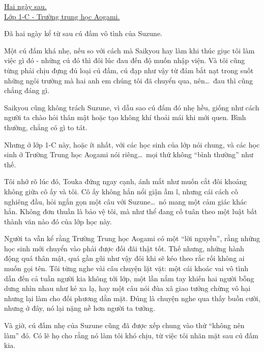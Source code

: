 \documentclass[../main.tex]{subfiles}
\begin{document}

\begin{center}
  \uline{Hai ngày sau.\\Lớp 1-C - Trường trung học Aogami.}
\end{center}

Đã hai ngày kể từ sau cú đấm vô tình của Suzune.

Một cú đấm khá nhẹ, nếu so với cách mà Saikyou hay làm khi thúc giục tôi làm việc gì đó - những cú đó thì đôi lúc đau đến độ muốn nhập viện. Và tôi cũng từng phải chịu đựng đủ loại cú đấm, cú đạp như vậy từ đám bắt nạt trong suốt những ngôi trường mà hai anh em chúng tôi đã chuyển qua, nên\dots\ đau thì cũng chẳng đáng gì.

Saikyou cũng không trách Suzune, vì dẫu sao cú đấm đó nhẹ hều, giống như cách người ta chào hỏi thân mật hoặc tạo không khí thoải mái khi mới quen. Bình thường, chẳng có gì to tát.

Nhưng ở lớp 1-C này, hoặc ít nhất, với các học sinh của lớp nói chung, và các học sinh ở Trường Trung học Aogami nói riêng\dots\ mọi thứ không ``bình thường'' như thế.

Tôi nhớ rõ lúc đó, Touka đứng ngay cạnh, ánh mắt như muốn cắt đôi khoảng không giữa cô ấy và tôi. Cô ấy không hẳn nổi giận ầm ĩ, nhưng cái cách cô nghiêng đầu, hỏi ngắn gọn một câu với Suzune\dots\ nó mang một cảm giác khác hẳn. Không đơn thuần là bảo vệ tôi, mà như thể đang cố tuân theo một luật bất thành văn nào đó của lớp học này.

Người ta vẫn kể rằng Trường Trung học Aogami có một ``lời nguyền'', rằng những học sinh mới chuyển vào phải được đối đãi thật tốt. Thế nhưng, những hành động quá thân mật, quá gần gũi như vậy đôi khi sẽ kéo theo rắc rối không ai muốn gọi tên. Tôi từng nghe vài câu chuyện lặt vặt: một cái khoác vai vô tình dẫn đến cả tuần người kia không tới lớp, một lần nắm tay khiến hai người bỗng dưng nhìn nhau như kẻ xa lạ, hay một câu nói đùa xã giao tưởng chừng vô hại nhưng lại làm cho đối phương dằn mặt. Đúng là chuyện nghe qua thấy buồn cười, nhưng ở đây, nó lại nặng nề hơn người ta tưởng.

Và giờ, cú đấm nhẹ của Suzune cũng đã được xếp chung vào thứ ``không nên làm'' đó. Có lẽ họ cho rằng nó làm tôi khó chịu, từ việc tôi nhăn mặt sau cú đấm kia.
\end{document}
